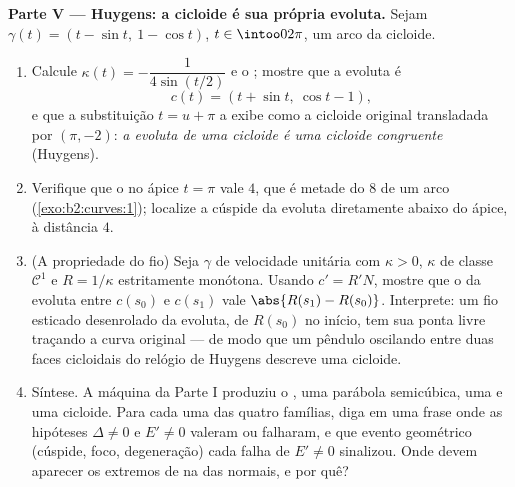 \begin{problem}
\medskip
\noindent\textbf{Parte V --- Huygens: a cicloide é sua própria
evoluta.} Sejam $\gamma(t) = (t - \sin t,\ 1 - \cos t)$, $t \in
\intoo0{2\pi}$, um arco da cicloide.
\begin{enumerate}[resume]
  \item Calcule $\kappa(t) = -\dfrac1{4\sin(t/2)}$ e o
        ; mostre que a evoluta é
        \[
        c(t) = (t + \sin t,\ \cos t - 1),
        \]
        e que a substituição $t = u + \pi$ a exibe
        como a cicloide original transladada por $(\pi, -2)$:
        \emph{a evoluta de uma cicloide é uma cicloide
        congruente} (Huygens).
  \item Verifique que o  no ápice $t =
        \pi$ vale $4$, que é metade do  $8$ de um
        arco (\cref{exo:b2:curves:1}); localize a cúspide da
        evoluta diretamente abaixo do ápice, à distância $4$.
  \item (A propriedade do fio) Seja $\gamma$ de velocidade unitária com
        $\kappa > 0$, $\kappa$ de classe $\mathcal C^1$ e
        $R = 1/\kappa$ estritamente monótona. Usando $c' = R'N$,
        mostre que o  da evoluta entre
        $c(s_0)$ e $c(s_1)$ vale $\abs{R(s_1) - R(s_0)}$.
        Interprete: um fio esticado desenrolado da evoluta,
        de  $R(s_0)$ no início, tem sua ponta livre
        traçando a curva original --- de modo que um pêndulo oscilando
        entre duas faces cicloidais do relógio de Huygens
        descreve uma cicloide.
  \item Síntese. A máquina da Parte I produziu o
        , uma parábola semicúbica, uma  e uma
        cicloide. Para cada uma das quatro famílias, diga em uma
        frase onde as hipóteses $\Delta \neq 0$ e
        $E' \neq 0$ valeram ou falharam, e que evento geométrico
        (cúspide, foco, degeneração) cada falha de $E' \neq 0$
        sinalizou. Onde devem aparecer os extremos de  na
         das normais, e por quê?
\end{enumerate}
\end{problem}
